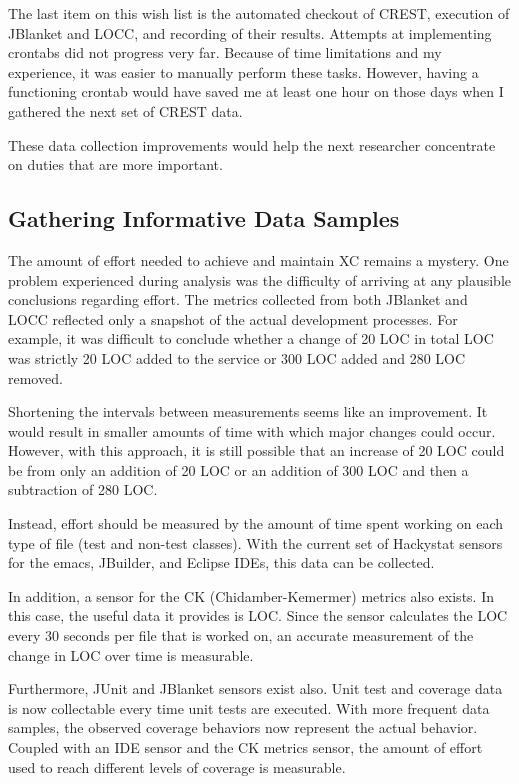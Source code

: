 The last item on this wish list is the automated checkout of CREST,
execution of JBlanket and LOCC, and recording of their results.  Attempts
at implementing crontabs did not progress very far.  Because of time
limitations and my experience, it was easier to manually perform these
tasks.  However, having a functioning crontab would have saved me at least
one hour on those days when I gathered the next set of CREST data.

These data collection improvements would help the next researcher
concentrate on duties that are more important.

\subsection{Gathering Informative Data Samples}
The amount of effort needed to achieve and maintain XC remains a mystery.
One problem experienced during analysis was the difficulty of arriving at
any plausible conclusions regarding effort.  The metrics collected from
both JBlanket and LOCC reflected only a snapshot of the actual development
processes.  For example, it was difficult to conclude whether a change of
20 LOC in total LOC was strictly 20 LOC added to the service or 300 LOC
added and 280 LOC removed.

Shortening the intervals between measurements seems like an improvement.
It would result in smaller amounts of time with which major changes could
occur.  However, with this approach, it is still possible that an increase
of 20 LOC could be from only an addition of 20 LOC or an addition of 300
LOC and then a subtraction of 280 LOC.

Instead, effort should be measured by the amount of time spent working on
each type of file (test and non-test classes).  With the current set of
Hackystat sensors for the emacs, JBuilder, and Eclipse IDEs, this data can
be collected.

In addition, a sensor for the CK (Chidamber-Kemermer) metrics also exists.
In this case, the useful data it provides is LOC.  Since the sensor
calculates the LOC every 30 seconds per file that is worked on, an accurate
measurement of the change in LOC over time is measurable.

Furthermore, JUnit and JBlanket sensors exist also.  Unit test and coverage
data is now collectable every time unit tests are executed.  With more
frequent data samples, the observed coverage behaviors now represent the
actual behavior.  Coupled with an IDE sensor and the CK metrics sensor, the
amount of effort used to reach different levels of coverage is measurable.


